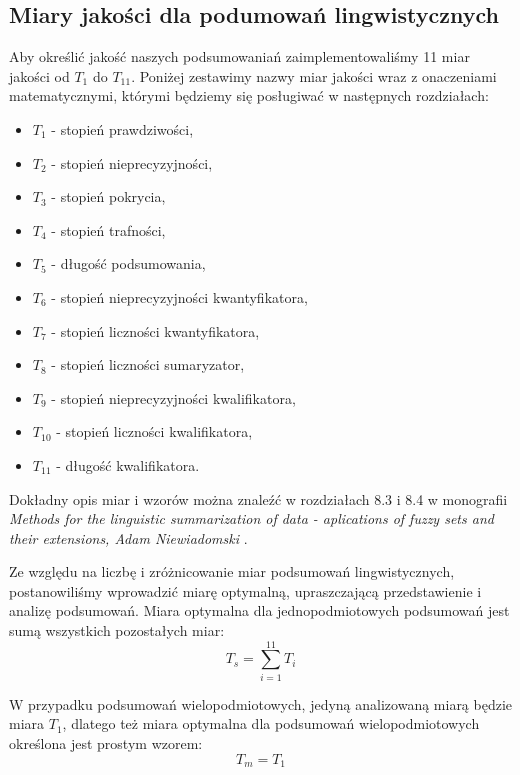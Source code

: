 \documentclass{classrep}
\begin{document}
\subsection{Miary jakości dla podumowań lingwistycznych}

Aby określić jakość naszych podsumowaniań zaimplementowaliśmy 11 miar jakości od $T_1$ do $T_{11}$. Poniżej zestawimy nazwy miar jakości wraz z onaczeniami matematycznymi, którymi będziemy się posługiwać w następnych rozdziałach:

\begin{itemize}[label=$\bullet$\scshape\bfseries]
\item $T_1$ - stopień prawdziwości,
\item $T_2$ - stopień nieprecyzyjności,
\item $T_3$ - stopień pokrycia,
\item $T_4$ - stopień trafności,
\item $T_5$ - długość podsumowania,
\item $T_6$ - stopień nieprecyzyjności kwantyfikatora,
\item $T_7$ - stopień liczności kwantyfikatora,
\item $T_8$ - stopień liczności sumaryzator,
\item $T_9$ - stopień nieprecyzyjności kwalifikatora,
\item $T_{10}$ - stopień liczności kwalifikatora,
\item $T_{11}$ - długość kwalifikatora.
\end{itemize}

Dokładny opis miar i wzorów można znaleźć w rozdziałach 8.3 i 8.4 w monografii \textit{Methods for the linguistic summarization of data - aplications of fuzzy sets and their extensions, Adam Niewiadomski} \cite{ksiazka}.\newline

Ze względu na liczbę i zróżnicowanie miar podsumowań lingwistycznych, postanowiliśmy wprowadzić miarę optymalną, upraszczającą przedstawienie i analizę podsumowań. Miara optymalna dla jednopodmiotowych podsumowań jest sumą wszystkich pozostałych miar:
\begin{equation}
T_s = \sum_{i=1}^{11} T_{i}
\end{equation}

W przypadku podsumowań wielopodmiotowych, jedyną analizowaną miarą będzie miara $T_1$, dlatego też miara optymalna dla podsumowań wielopodmiotowych określona jest prostym wzorem:
\begin{equation}
T_m = T_{1}
\end{equation}
\end{document}
